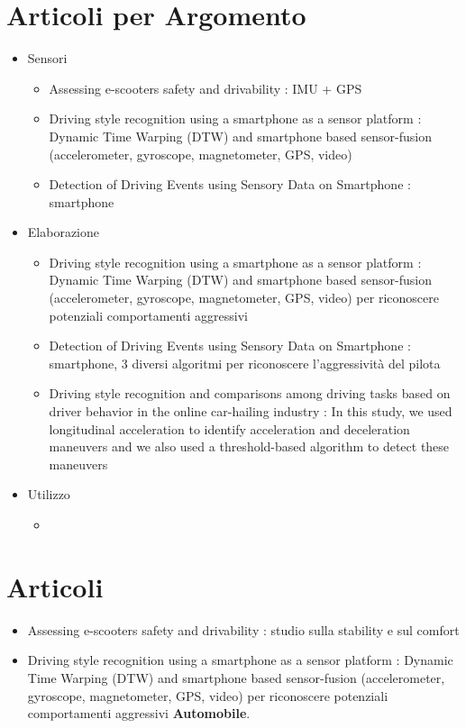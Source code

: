 \documentclass[12pt, a4paper]{article}
\begin{document}
	\section*{Articoli per Argomento}
	\begin{itemize}
		\item Sensori
		\begin{itemize}
			\item Assessing e-scooters safety and drivability \cite{leoni}: IMU + GPS
			\item Driving style recognition using a smartphone as a sensor platform \cite{dtw}: Dynamic Time Warping (DTW) and smartphone based sensor-fusion (accelerometer,
			gyroscope, magnetometer, GPS, video)
			\item Detection of Driving Events using Sensory Data on Smartphone \cite{dtwAndCo}: smartphone
		\end{itemize}
		\item Elaborazione
		\begin{itemize}
			\item Driving style recognition using a smartphone as a sensor platform \cite{dtw}: Dynamic Time Warping (DTW) and smartphone based sensor-fusion (accelerometer,
			gyroscope, magnetometer, GPS, video) per riconoscere potenziali comportamenti aggressivi
			
			\item Detection of Driving Events using Sensory Data on Smartphone \cite{dtwAndCo}: smartphone, 3 diversi algoritmi per riconoscere l'aggressività del pilota
			
			\item Driving style recognition and comparisons among driving tasks based on driver behavior in the online car-hailing industry \cite{MA2021106096}: In this study, we used longitudinal acceleration to identify acceleration and deceleration maneuvers and we also used a threshold-based algorithm to detect these maneuvers
		\end{itemize}
		\item Utilizzo
		\begin{itemize}
			\item
		\end{itemize}
	\end{itemize}

\section*{Articoli}
\begin{itemize}
	\item Assessing e-scooters safety and drivability \cite{leoni}: studio sulla stability e sul comfort
	\item Driving style recognition using a smartphone as a sensor platform \cite{dtw}: Dynamic Time Warping (DTW) and smartphone based sensor-fusion (accelerometer,
	gyroscope, magnetometer, GPS, video) per riconoscere potenziali comportamenti aggressivi \textbf{Automobile}.
\end{itemize}

\newpage
\printbibliography[title={Bibliografia}]
	
\end{document}
